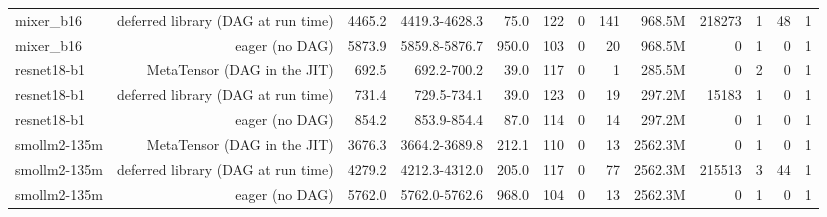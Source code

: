 \begin{tabular}{lrrrrrrrrrrrr}
mixer\_b16 & deferred library (DAG at run time) & 4465.2 & 4419.3-4628.3 & 75.0 & 122 & 0 & 141 & 968.5M & 218273 & 1 & 48 & 1 \\
mixer\_b16 & eager (no DAG) & 5873.9 & 5859.8-5876.7 & 950.0 & 103 & 0 & 20 & 968.5M & 0 & 1 & 0 & 1 \\
resnet18-b1 & MetaTensor (DAG in the JIT) & 692.5 & 692.2-700.2 & 39.0 & 117 & 0 & 1 & 285.5M & 0 & 2 & 0 & 1 \\
resnet18-b1 & deferred library (DAG at run time) & 731.4 & 729.5-734.1 & 39.0 & 123 & 0 & 19 & 297.2M & 15183 & 1 & 0 & 1 \\
resnet18-b1 & eager (no DAG) & 854.2 & 853.9-854.4 & 87.0 & 114 & 0 & 14 & 297.2M & 0 & 1 & 0 & 1 \\
smollm2-135m & MetaTensor (DAG in the JIT) & 3676.3 & 3664.2-3689.8 & 212.1 & 110 & 0 & 13 & 2562.3M & 0 & 1 & 0 & 1 \\
smollm2-135m & deferred library (DAG at run time) & 4279.2 & 4212.3-4312.0 & 205.0 & 117 & 0 & 77 & 2562.3M & 215513 & 3 & 44 & 1 \\
smollm2-135m & eager (no DAG) & 5762.0 & 5762.0-5762.6 & 968.0 & 104 & 0 & 13 & 2562.3M & 0 & 1 & 0 & 1 \\
\bottomrule
\end{tabular}
